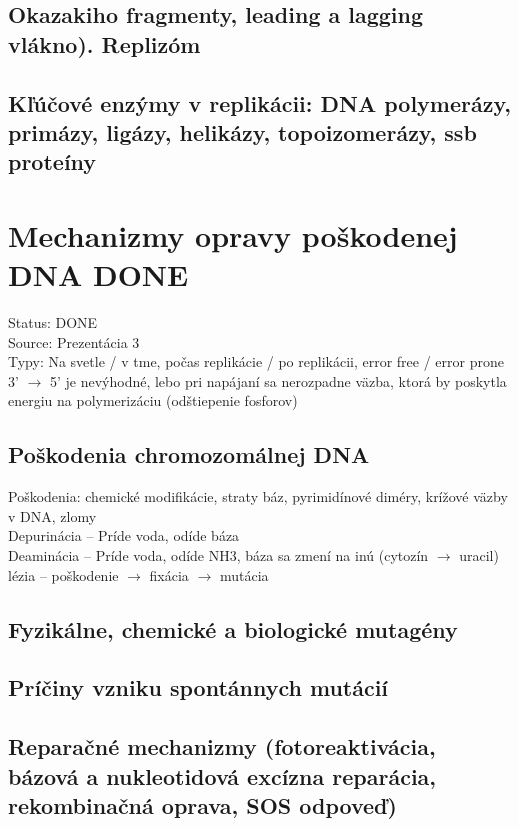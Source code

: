 \subsection{Okazakiho fragmenty, leading a lagging vlákno). Replizóm}

\subsection{Kľúčové enzýmy v replikácii: DNA polymerázy, primázy, ligázy, helikázy, topoizomerázy, ssb proteíny}

\section{Mechanizmy opravy poškodenej DNA DONE}

Status: DONE\\
Source: Prezentácia 3\\

Typy: Na svetle / v tme, počas replikácie / po replikácii, error free / error prone\\
3' $\rightarrow$ 5' je nevýhodné, lebo pri napájaní sa nerozpadne väzba, ktorá by poskytla energiu na polymerizáciu (odštiepenie fosforov)\\

\subsection{Poškodenia chromozomálnej DNA}
Poškodenia: chemické modifikácie, straty báz, pyrimidínové diméry, krížové väzby v DNA, zlomy\\
Depurinácia -- Príde voda, odíde báza\\
Deaminácia -- Príde voda, odíde NH3, báza sa zmení na inú (cytozín $\rightarrow$ uracil)\\
lézia -- poškodenie $\rightarrow$ fixácia $\rightarrow$ mutácia\\
\subsection{Fyzikálne, chemické a biologické mutagény}

\subsection{Príčiny vzniku spontánnych mutácií}

\subsection{Reparačné mechanizmy (fotoreaktivácia, bázová a nukleotidová excízna reparácia, rekombinačná oprava, SOS odpoveď)}

